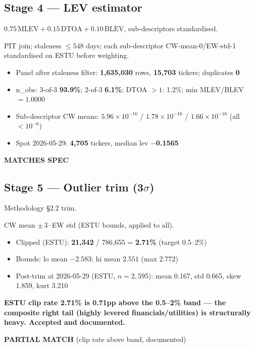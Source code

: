 \documentclass[11pt,a4paper]{article}
\newcommand{\PASS}[1]{\textcolor{pass}{\textbf{#1}}}
\newcommand{\WARN}[1]{\textcolor{warn}{\textbf{#1}}}
\begin{document}
\subsection{Stage 4 --- LEV estimator}

\begin{description}[style=nextline]
  \item[PDF SPEC] $0.75\,\mathrm{MLEV} + 0.15\,\mathrm{DTOA} + 0.10\,\mathrm{BLEV}$, sub-descriptors standardised.
  \item[Implementation] PIT join; staleness $\leq548$ days; each sub-descriptor CW-mean-0/EW-std-1 standardised on ESTU before weighting.
  \item[Observed]\phantom{x}
    \begin{itemize}[nosep, topsep=-\parskip]
      \item Panel after staleness filter: \textbf{1{,}635{,}030} rows, \textbf{15{,}703} tickers; duplicates \textbf{0}
      \item n\_obs: 3-of-3 \textbf{93.9\%}; 2-of-3 \textbf{6.1\%}; DTOA $>1$: 1.2\%; min MLEV/BLEV $=1.0000$
      \item Sub-descriptor CW means: $5.96\times10^{-16}$ / $1.78\times10^{-16}$ / $1.66\times10^{-16}$ (all $<10^{-6}$)
      \item Spot 2026-05-29: \textbf{4{,}705} tickers, median lev \textbf{$-$0.1565}
    \end{itemize}
  \item[Status] \PASS{MATCHES SPEC}
\end{description}

\subsection{Stage 5 --- Outlier trim (3$\sigma$)}

\begin{description}[style=nextline]
  \item[PDF SPEC] Methodology \S2.2 trim.
  \item[Implementation] CW mean $\pm\,3\cdot$EW std (ESTU bounds, applied to all).
  \item[Observed]\phantom{x}
    \begin{itemize}[nosep, topsep=-\parskip]
      \item Clipped (ESTU): \textbf{21{,}342} / 786{,}655 = \textbf{2.71\%} (target 0.5--2\%)
      \item Bounds: lo mean $-2.583$; hi mean $2.551$ (max $2.772$)
      \item Post-trim at 2026-05-29 (ESTU, $n=2{,}595$): mean 0.167, std 0.665, skew 1.859, kurt 3.210
    \end{itemize}
  \item[Deviation] \WARN{ESTU clip rate 2.71\% is 0.71pp above the 0.5--2\% band --- the composite right tail (highly levered financials/utilities) is structurally heavy. Accepted and documented.}
  \item[Status] \WARN{PARTIAL MATCH} (clip rate above band, documented)
\end{description}
\end{document}
